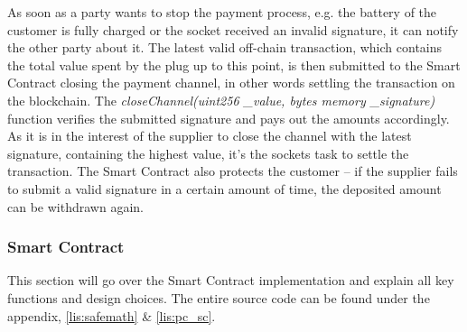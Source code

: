 As soon as a party wants to stop the payment process, e.g. the battery of the customer is fully charged or the socket received an invalid signature, it can notify the other party about it. The latest valid off-chain transaction, which contains the total value spent by the plug up to this point, is then submitted to the Smart Contract closing the payment channel, in other words settling the transaction on the blockchain. The \textit{closeChannel(uint256 \_value, bytes memory \_signature)} function verifies the submitted signature and pays out the amounts accordingly.
\\
As it is in the interest of the supplier to close the channel with the latest signature, containing the highest value, it’s the sockets task to settle the transaction. The Smart Contract also protects the customer – if the supplier fails to submit a valid signature in a certain amount of time, the deposited amount can be withdrawn again.

\subsubsection{Smart Contract}
This section will go over the Smart Contract implementation and explain all key functions and design choices. The entire source code can be found under the appendix, \ref{lis:safemath} \& \ref{lis:pc_sc}.